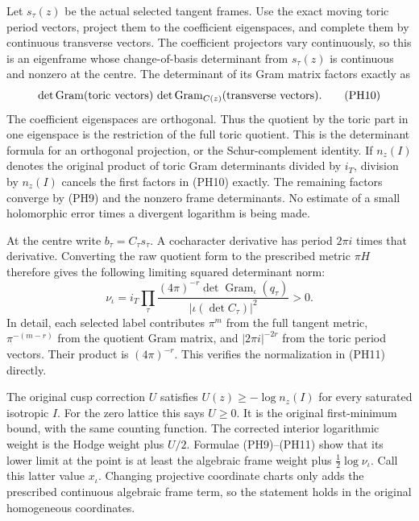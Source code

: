 Let $s_\tau(z)$ be the actual selected tangent frames. Use the exact
moving toric period vectors, project them to the coefficient
eigenspaces, and complete them by continuous transverse vectors.
The coefficient projectors vary continuously, so this is an
eigenframe whose change-of-basis determinant from $s_\tau(z)$
is continuous and nonzero at the centre. The determinant of its
Gram matrix factors exactly as
\[
 \det\operatorname{Gram}(\hbox{toric vectors})\,
           \det\operatorname{Gram}_{C(z)}(\hbox{transverse vectors}).
 \tag{PH10}
\]
The coefficient eigenspaces are orthogonal. Thus the quotient by
the toric part in one eigenspace is the restriction of the full
toric quotient. This is the determinant formula for an orthogonal projection,
or the Schur-complement identity. If $n_z(I)$ denotes the original
product of toric Gram determinants divided by $i_T$, division by
$n_z(I)$ cancels the first factors in \textup{(PH10)} exactly.
The remaining factors converge by \textup{(PH9)} and the
nonzero frame determinants. No estimate of a small holomorphic
error times a divergent logarithm is being made.

At the centre write $b_\tau=C_\tau s_\tau$. A cocharacter
derivative has period $2\pi i$ times that derivative. Converting
the raw quotient form to the prescribed metric $\pi H$ therefore
gives the following limiting squared determinant norm:
\[
 \nu_\iota=i_T\prod_\tau
       \frac{(4\pi)^{-r}\det\operatorname{Gram}_\iota(q_\tau)}
                                {|\iota(\det C_\tau)|^2}>0.
 \tag{PH11}
\]
In detail, each selected label contributes $\pi^m$ from the
full tangent metric, $\pi^{-(m-r)}$ from the quotient Gram
matrix, and $|2\pi i|^{-2r}$ from the toric period vectors.
Their product is $(4\pi)^{-r}$. This verifies the normalization
in \textup{(PH11)} directly.

The original cusp correction $U$ satisfies
$U(z)\ge-\log n_z(I)$ for every saturated isotropic $I$.
For the zero lattice this says $U\ge0$. It is the original
first-minimum bound, with the same counting function.
The corrected interior logarithmic weight is the Hodge weight
plus $U/2$. Formulae \textup{(PH9)--(PH11)} show that its lower
limit at the point is at least the algebraic frame weight plus
$\tfrac12\log\nu_\iota$. Call this latter value $x_\iota$.
Changing projective coordinate charts only adds the prescribed
continuous algebraic frame term, so the statement holds in the
original homogeneous coordinates.

